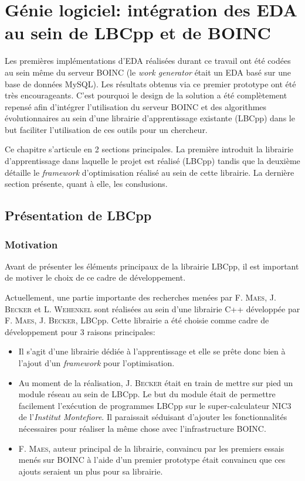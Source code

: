 \documentclass[a4paper, 12pt]{report}
\begin{document}
\chapter{Génie logiciel: intégration des EDA au sein de LBCpp et de \textsc{BOINC}}
\label{genie}
Les premières implémentations d'EDA réalisées durant ce travail ont été codées au sein même du serveur \textsc{BOINC} (le \textit{work generator} était un EDA basé sur une base de données MySQL). Les résultats obtenus via ce premier prototype ont été très encourageants. C'est pourquoi le design de la solution a été complètement repensé afin d'intégrer l'utilisation du serveur \textsc{BOINC} et des algorithmes évolutionnaires au sein d'une librairie d'apprentissage existante (LBCpp) dans le but faciliter l'utilisation de ces outils pour un chercheur.

Ce chapitre s'articule en 2 sections principales. La première introduit la librairie d'apprentissage dans laquelle le projet est réalisé (LBCpp) tandis que la deuxième détaille le \textit{framework} d'optimisation réalisé au sein de cette librairie. La dernière section présente, quant à elle, les conslusions.

\minitoc

\section{Présentation de LBCpp}
\label{LBCpp}
\subsection{Motivation}
Avant de présenter les éléments principaux de la librairie LBCpp, il est important de motiver le choix de ce cadre de développement.

Actuellement, une partie importante des recherches menées par F. \textsc{Maes}, J. \textsc{Becker} et L. \textsc{Wehenkel} sont réalisées au sein d'une librairie C++ développée par F. \textsc{Maes}, J. \textsc{Becker}, LBCpp. Cette librairie a été choisie comme cadre de développement pour 3 raisons principales:
\begin{itemize}
\item Il s'agit d'une librairie dédiée à l'apprentissage et elle se prête donc bien à l'ajout d'un \textit{framework} pour l'optimisation.
\item Au moment de la réalisation, J. \textsc{Becker} était en train de mettre sur pied un module réseau au sein de LBCpp. Le but du module était de permettre facilement l'exécution de programmes LBCpp sur le super-calculateur NIC3 de l'\textit{Institut Montefiore}. Il paraissait séduisant d'ajouter les fonctionnalités nécessaires pour réaliser la même chose avec l'infrastructure \textsc{BOINC}.
\item F. \textsc{Maes}, auteur principal de la librairie, convaincu par les premiers essais menés sur \textsc{BOINC} à l'aide d'un premier prototype était convaincu que ces ajouts seraient un plus pour sa librairie.
\end{itemize}
\end{document}
